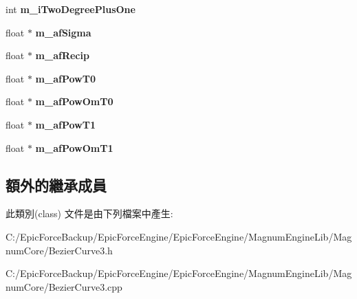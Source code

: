 \begin{DoxyCompactItemize}
\item 
int {\bfseries m\+\_\+i\+Two\+Degree\+Plus\+One}\hypertarget{class_magnum_1_1_bezier_curve3_abdbd46ad64f1bcd49fe8c7629ffb740d}{}\label{class_magnum_1_1_bezier_curve3_abdbd46ad64f1bcd49fe8c7629ffb740d}

\item 
float $\ast$ {\bfseries m\+\_\+af\+Sigma}\hypertarget{class_magnum_1_1_bezier_curve3_a8340c847a63c783efb6182f53809032a}{}\label{class_magnum_1_1_bezier_curve3_a8340c847a63c783efb6182f53809032a}

\item 
float $\ast$ {\bfseries m\+\_\+af\+Recip}\hypertarget{class_magnum_1_1_bezier_curve3_ad800d67ef87395afae0056a8c426f729}{}\label{class_magnum_1_1_bezier_curve3_ad800d67ef87395afae0056a8c426f729}

\item 
float $\ast$ {\bfseries m\+\_\+af\+Pow\+T0}\hypertarget{class_magnum_1_1_bezier_curve3_afc4e67aa452b05f991f13f24dd126941}{}\label{class_magnum_1_1_bezier_curve3_afc4e67aa452b05f991f13f24dd126941}

\item 
float $\ast$ {\bfseries m\+\_\+af\+Pow\+Om\+T0}\hypertarget{class_magnum_1_1_bezier_curve3_a4a9ceb30ab3752d5fb0a1a3d906dc6e7}{}\label{class_magnum_1_1_bezier_curve3_a4a9ceb30ab3752d5fb0a1a3d906dc6e7}

\item 
float $\ast$ {\bfseries m\+\_\+af\+Pow\+T1}\hypertarget{class_magnum_1_1_bezier_curve3_a156e12c5cf0d5968a16818f238e63663}{}\label{class_magnum_1_1_bezier_curve3_a156e12c5cf0d5968a16818f238e63663}

\item 
float $\ast$ {\bfseries m\+\_\+af\+Pow\+Om\+T1}\hypertarget{class_magnum_1_1_bezier_curve3_a03d1a6d2eefb723a99cc76a57b1c8a25}{}\label{class_magnum_1_1_bezier_curve3_a03d1a6d2eefb723a99cc76a57b1c8a25}

\end{DoxyCompactItemize}
\subsection*{額外的繼承成員}


此類別(class) 文件是由下列檔案中產生\+:\begin{DoxyCompactItemize}
\item 
C\+:/\+Epic\+Force\+Backup/\+Epic\+Force\+Engine/\+Epic\+Force\+Engine/\+Magnum\+Engine\+Lib/\+Magnum\+Core/Bezier\+Curve3.\+h\item 
C\+:/\+Epic\+Force\+Backup/\+Epic\+Force\+Engine/\+Epic\+Force\+Engine/\+Magnum\+Engine\+Lib/\+Magnum\+Core/Bezier\+Curve3.\+cpp\end{DoxyCompactItemize}

